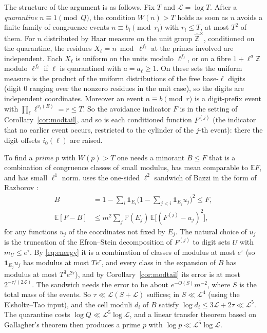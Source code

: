 \documentclass[11pt,reqno]{amsart}
\theoremstyle{definition}
\newcommand{\E}{\mathbb E}
\newcommand{\PP}{\mathbb P}
\newcommand{\Lc}{\mathcal L}
\begin{document}
The structure of the argument is as follows.  Fix $T$ and $\Lc=\log T$.  After a
\emph{quarantine} $n\equiv1\pmod Q$, the condition $W(n)>T$ holds as soon as $n$
avoids a finite family of congruence events $n\equiv b_i\pmod{r_i}$ with
$r_i\le T$, at most $T^2$ of them.  For $n$ distributed by Haar measure on the
unit group $\widehat{\mathbb Z}^\times$, conditioned on the quarantine, the residues
$X_\ell=n\bmod\ell^{f_\ell}$ at the primes involved are independent.  Each $X_\ell$ is
uniform on the units modulo $\ell^{f_\ell}$, or on a fibre $1+\ell^a\mathbb Z$ modulo $\ell^{f_\ell}$ if
$\ell$ is quarantined with $a=a_\ell\ge1$.  On these sets the uniform measure is the
product of the uniform distributions of the free base-$\ell$ digits (digit $0$
ranging over the nonzero residues in the unit case), so the digits are
independent coordinates.  Moreover an event $n\equiv b\pmod r$ is a digit-prefix event with
$\prod_\ell\ell^{v_\ell(E)}=r\le T$.  So the avoidance indicator $F$ is in the setting of
Corollary~\ref{cor:modtail}, and so is each conditioned function $F^{(j)}$
(the indicator that no earlier event occurs, restricted to the cylinder of
the $j$-th event): there the digit offsets $i_0(\ell)$ are raised.

To find a \emph{prime} $p$ with $W(p)>T$ one needs a minorant
$B\le F$ that is a combination of congruence classes of small modulus, has
mean comparable to $\E F$, and has small $\ell^1$ norm.  \cite{Subexp} uses the
one-sided $\ell^2$ sandwich of Bazzi \cite{Bazzi} in the form of Razborov
\cite{Razborov}:
\begin{align*}
 B&=1-\sum_i\mathbf 1_{E_i}\Big(1-\sum_{j<i}\mathbf 1_{E_j}u_j\Big)^2\le F,\\
 \E[F-B]&\le m^2\sum_j\PP(E_j)\,\E\big[(F^{(j)}-u_j)^2\big],
\end{align*}
for any functions $u_j$ of the coordinates not fixed by $E_j$.  The natural
choice of $u_j$ is the truncation of the Efron--Stein decomposition of $F^{(j)}$
to digit sets $U$ with $m_U\le e^\tau$.  By \eqref{eq:energy} it is a combination
of classes of modulus at most $e^\tau$ (so $\mathbf 1_{E_j}u_j$ has modulus at most
$Te^\tau$, and every class in the expansion of $B$ has modulus at most
$T^3e^{2\tau}$), and by Corollary~\ref{cor:modtail} its
error is at most $2^{-\tau/(2\Lc)}$.  The sandwich needs the error to be about
$e^{-O(S)}m^{-2}$, where $S$ is the total mass of the events.  So
$\tau\ll\Lc(S+\Lc)$ suffices; in \cite{Subexp} $S\ll\Lc^4$ (using the
Elsholtz--Tao input), and the cell moduli $d_i$ of $B$ satisfy $\log d_i\le3\Lc+2\tau\ll\Lc^5$.  The
quarantine costs $\log Q\ll\Lc^5\log\Lc$, and a linear transfer theorem based on
Gallagher's theorem then produces a prime $p$ with $\log p\ll\Lc^5\log\Lc$.
\end{document}
